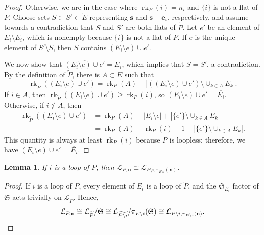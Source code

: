 \documentclass[11pt]{article}
\newtheorem{lemm}[theo]{Lemma}
\theoremstyle{definition}
\numberwithin{equation}{section}
\DeclareMathOperator{\rk}{rk}
\begin{document}
\begin{proof}
Otherwise, we are in the case where $\rk_P(i) = n_i$ and $\{i\}$ is not a flat of $P$.
Choose sets $S \subset S' \subset \widetilde E$ representing $\mathbf s$ and $\mathbf s + \mathbf e_i$, respectively, and
assume towards a contradiction that $S$ and $S'$ are both flats of $\widetilde P$.
Let $e'$ be an element of $\overline{E_i} \setminus E_i$, which is nonempty because $\{i\}$ is not a flat of $P$.
If $e$ is the unique element of $S' \setminus S$, then $S$ contains $\overline{(E_i \setminus e) \cup e'}$.

We now show that $\overline{(E_i \setminus e) \cup e'} = \overline{E_i}$, which implies that $S = S'$, a contradiction.
By the definition of $\widetilde P$, there is $A \subset E$ such that
\[
  \rk_{\widetilde P}((E_i \setminus e) \cup e') = \rk_P(A) + |((E_i \setminus e) \cup e') \setminus \cup_{k \in A} E_k|.
\]
If $i \in A$, then $\rk_{\widetilde P}((E_i \setminus e) \cup e') \geq \rk_P(i)$, so $\overline{(E_i \setminus e) \cup e'} = \overline{E_i}$.
Otherwise, if $i \not \in A$, then
\begin{align*}
\rk_{\widetilde P}((E_i \setminus e) \cup e') &= \rk_P(A) + |E_i \setminus e| + |\{e'\} \setminus \cup_{k \in A} E_k|\\
&= \rk_P(A) + \rk_P(i) - 1 + |\{e'\} \setminus \cup_{k \in A} E_k|. 
\end{align*}
This quantity is always at least $\rk_P(i)$ because $P$ is loopless; therefore, we have $\overline{(E_i\setminus e) \cup e'} = \overline{E_i}$.
\end{proof}
\begin{lemm}\label{deloop}
  If $i$ is a loop of $P$, then $ \mathcal L_{P, \mathbf n} \cong \mathcal L_{P\setminus i, \pi_{E \setminus i}(\mathbf n)}$.
\end{lemm}
\begin{proof}
  If $i$ is a loop of $P$, every element of $E_i$ is a loop of $\widetilde P$, and the $\mathfrak S_{E_i}$ factor of $\mathfrak S$ acts trivially on $\mathcal L_{\widetilde P}$.
  Hence,
  \[
  \mathcal L_{P, \mathbf n} \cong \mathcal L_{\widetilde P} / \mathfrak S  \cong \mathcal L_{\widetilde{P \setminus i}} /  \pi_{E \setminus i}(\mathfrak S) \cong \mathcal L_{P\setminus i, \pi_{E \setminus i}(\mathbf n)}.\qedhere
  \]
\end{proof}
\end{document}
